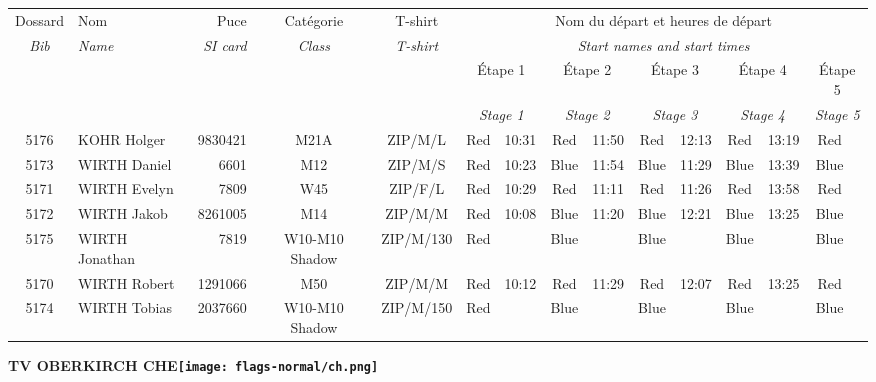 \documentclass{report}
\begin{document}
  \begin{longtable}{|c|l|r|c|c|*{5}{cc|}}
    Dossard & Nom  & Puce    & Catégorie & T-shirt & \multicolumn{10}{c|}{Nom du départ et heures de départ} \\
    \itshape Bib     & \itshape Name & \itshape SI card & \itshape Class  & \itshape  T-shirt  & \multicolumn{10}{c|}{\itshape Start names and start times} \\
    \hline
    & & & & & \multicolumn{2}{c|}{Étape 1} & \multicolumn{2}{c|}{Étape 2} & \multicolumn{2}{c|}{Étape 3} & \multicolumn{2}{c|}{Étape 4} & \multicolumn{2}{c|}{Étape 5} \\
    & & & & & \multicolumn{2}{c|}{\itshape Stage 1} & \multicolumn{2}{c|}{\itshape Stage 2} & \multicolumn{2}{c|}{\itshape Stage 3} & \multicolumn{2}{c|}{\itshape Stage 4} & \multicolumn{2}{c|}{\itshape Stage 5} \\
    \hline
    5176 & KOHR Holger & 9830421 & M21A & ZIP/M/L & Red & 10:31 & Red & 11:50 & Red & 12:13 & Red & 13:19 & Red &  \\
    5173 & WIRTH Daniel & 6601 & M12 & ZIP/M/S & Red & 10:23 & Blue & 11:54 & Blue & 11:29 & Blue & 13:39 & Blue &  \\
    5171 & WIRTH Evelyn & 7809 & W45 & ZIP/F/L & Red & 10:29 & Red & 11:11 & Red & 11:26 & Red & 13:58 & Red &  \\
    5172 & WIRTH Jakob & 8261005 & M14 & ZIP/M/M & Red & 10:08 & Blue & 11:20 & Blue & 12:21 & Blue & 13:25 & Blue &  \\
    5175 & WIRTH Jonathan & 7819 & W10-M10 Shadow & ZIP/M/130 & Red &   & Blue &   & Blue &   & Blue &   & Blue &  \\
    5170 & WIRTH Robert & 1291066 & M50 & ZIP/M/M & Red & 10:12 & Red & 11:29 & Red & 12:07 & Red & 13:25 & Red &  \\
    5174 & WIRTH Tobias & 2037660 & W10-M10 Shadow & ZIP/M/150 & Red &   & Blue &   & Blue &   & Blue &   & Blue &  \\
  \end{longtable}
\newpage
  \Huge \centering \bfseries TV OBERKIRCH  CHE\normalfont \footnotesize \sffamily \hfill \texttt{[image: flags-normal/ch.png]} \newline 
\end{document}
